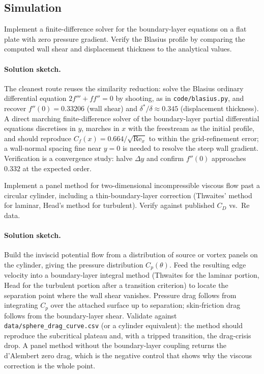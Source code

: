 \subsection*{Simulation}

\begin{exercise}
Implement a finite-difference solver for the boundary-layer
equations on a flat plate with zero pressure gradient. Verify the
Blasius profile by comparing the computed wall shear and
displacement thickness to the analytical values.

\paragraph{Solution sketch.} The cleanest route reuses the similarity
reduction: solve the Blasius ordinary differential equation $2f'''
+ ff'' = 0$ by shooting, as in \texttt{code/blasius.py}, and recover
$f''(0) = 0.33206$ (wall shear) and $\delta^*/\delta\approx0.345$
(displacement thickness). A direct marching finite-difference solver
of the boundary-layer partial differential equations discretises in
$y$, marches in $x$ with the freestream as the initial profile, and
should reproduce $C_f(x) = 0.664/\sqrt{\text{Re}_x}$ to within the
grid-refinement error; a wall-normal spacing fine near $y=0$ is
needed to resolve the steep wall gradient. Verification is a
convergence study: halve $\Delta y$ and confirm $f''(0)$ approaches
$0.332$ at the expected order.
\end{exercise}

\begin{exercise}
Implement a panel method for two-dimensional incompressible viscous
flow past a circular cylinder, including a thin-boundary-layer
correction (Thwaites' method for laminar, Head's method for
turbulent). Verify against published $C_D$ vs.\ $\text{Re}$ data.

\paragraph{Solution sketch.} Build the inviscid potential flow from a
distribution of source or vortex panels on the cylinder, giving the
pressure distribution $C_p(\theta)$. Feed the resulting edge velocity
into a boundary-layer integral method (Thwaites for the laminar
portion, Head for the turbulent portion after a transition criterion)
to locate the separation point where the wall shear vanishes.
Pressure drag follows from integrating $C_p$ over the attached
surface up to separation; skin-friction drag follows from the
boundary-layer shear. Validate against
\texttt{data/sphere\_drag\_curve.csv} (or a cylinder equivalent): the
method should reproduce the subcritical plateau and, with a tripped
transition, the drag-crisis drop. A panel method without the
boundary-layer coupling returns the d'Alembert zero drag, which is
the negative control that shows why the viscous correction is the
whole point.
\end{exercise}

